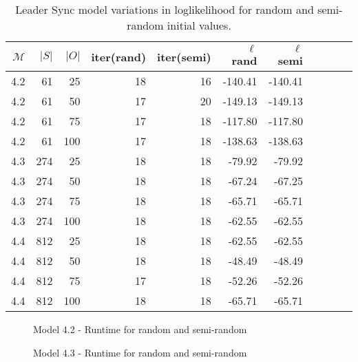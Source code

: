 \begin{table}
    \centering
    \caption{Leader Sync model variations in loglikelihood for random and semi-random initial values.}
    \label{tab:leader_results_loglikelihood}
    \begin{tabular}{rrrrrrrrrrr}
        \toprule
        $\mathcal{M}$ & $|S|$ & $|O|$ & iter(rand) & iter(semi) & $\ell$ rand & $\ell$ semi \\
        \midrule
        4.2           & 61    & 25    & 18         & 16         & -140.41     & -140.41     \\
        4.2           & 61    & 50    & 17         & 20         & -149.13     & -149.13     \\
        4.2           & 61    & 75    & 17         & 18         & -117.80     & -117.80     \\
        4.2           & 61    & 100   & 17         & 18         & -138.63     & -138.63     \\
        4.3           & 274   & 25    & 18         & 18         & -79.92      & -79.92      \\
        4.3           & 274   & 50    & 18         & 18         & -67.24      & -67.25      \\
        4.3           & 274   & 75    & 18         & 18         & -65.71      & -65.71      \\
        4.3           & 274   & 100   & 18         & 18         & -62.55      & -62.55      \\
        4.4           & 812   & 25    & 18         & 18         & -62.55      & -62.55      \\
        4.4           & 812   & 50    & 18         & 18         & -48.49      & -48.49      \\
        4.4           & 812   & 75    & 17         & 18         & -52.26      & -52.26      \\
        4.4           & 812   & 100   & 18         & 18         & -65.71      & -65.71      \\
        \bottomrule
    \end{tabular}
\end{table}


\begin{figure}
    
    \caption{Model 4.2 - Runtime for random and semi-random}
    \label{fig:semirandom-cupaal-jajapy-4-2}
\end{figure}

\begin{figure}
    
    \caption{Model 4.3 - Runtime for random and semi-random}
    \label{fig:semirandom-cupaal-jajapy-4-3}
\end{figure}

